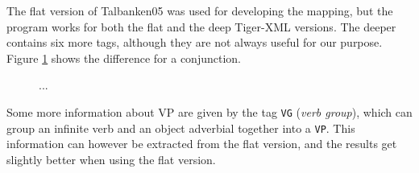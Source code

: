 \documentclass{report}
\begin{document}
The flat version of Talbanken05 was used for developing the mapping, but
the program works for both the flat and the deep Tiger-XML versions.
The deeper contains six more tags, although they are not always useful for our       
purpose. Figure \ref{fig:mappDeepFlat} shows the difference for a conjunction.
\begin{figure}[h]
\centering
{}
\caption{...}
\label{fig:mappDeepFlat}
\end{figure}

Some more information about VP are given by the tag \verb|VG| (\emph{verb group}),
which can group an infinite verb and an object adverbial together into a \verb|VP|.
This information can however be extracted from the flat version, and the results
get slightly better when using the flat version. \\
\end{document}
